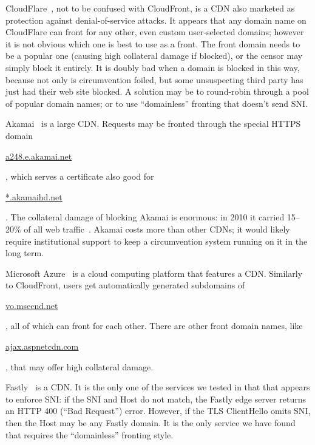 \documentclass[conference]{IEEEtran}
\newcommand{\meek}{meek\xspace}
\def\urll#1{\begin{NoHyper}\url{#1}\end{NoHyper}}
\begin{document}
CloudFlare~\cite{cloudflare},
not to be confused with CloudFront,
is a CDN also marketed as protection against
denial-of-service attacks.
It appears that any domain name on CloudFlare
can front for any other, even custom user-selected domains;
however it is not obvious which one is best to use as a front.
The front domain needs to be a popular one
(causing high collateral damage if blocked),
or the censor may simply block it entirely.
It is doubly bad when a domain is blocked in this way,
because not only is circumvention foiled,
but some unsuspecting third party has just had their web site blocked.
A solution may be to round-robin through
a pool of popular domain names;
or to use ``domainless'' fronting that doesn't send SNI.

Akamai~\cite{akamai-site} is a large CDN.
Requests may be fronted through the special HTTPS domain
\urll{a248.e.akamai.net},
which serves a certificate also good for \urll{*.akamaihd.net}.
The collateral damage of blocking Akamai is enormous:
in 2010 it carried 15--20\% of all web traffic~\cite{akamai}.
Akamai costs more than other CDNs;
it would likely require institutional support
to keep a circumvention system running on it in the long term.

Microsoft Azure~\cite{azure}
is a cloud computing platform that features a CDN.
Similarly to CloudFront, users get automatically generated subdomains
of \urll{vo.msecnd.net},
all of which can front for each other.
There are other front domain names, like \urll{ajax.aspnetcdn.com},
that may offer high collateral damage.

Fastly~\cite{fastly} is a CDN.
It is the only one of the services we tested in that
that appears to enforce SNI:
if the SNI and Host do not match,
the Fastly edge server returns an HTTP 400 (``Bad Request'') error.
However, if the TLS ClientHello omits SNI, then the Host may be any Fastly domain.
It is the only service we have found
that requires the ``domainless'' fronting style.
\end{document}
